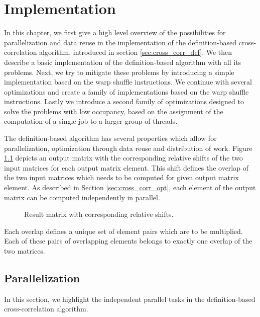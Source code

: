\chapter{Implementation}
\label{sec:implementation}

In this chapter, we first give a high level overview of the possibilities for parallelization and data reuse in the implementation of the definition-based cross-correlation algorithm, introduced in section \ref{sec:cross_corr_def}. We then describe a basic implementation of the definition-based algorithm with all its problems. Next, we try to mitigate these problems by introducing a simple implementation based on the warp shuffle instructions. We continue with several optimizations and create a family of implementations based on the warp shuffle instructions. Lastly we introduce a second family of optimizations designed to solve the problems with low occupancy, based on the assignment of the computation of a single job to a larger group of threads.


The definition-based algorithm has several properties which allow for parallelization, optimization through data reuse and distribution of work. Figure \ref{fig:cross_corr_shifts} depicts an output matrix with the corresponding relative shifts of the two input matrices for each output matrix element. This shift defines the overlap of the two input matrices which needs to be computed for given output matrix element. As described in Section \ref{sec:cross_corr_opt}, each element of the output matrix can be computed independently in parallel.

\begin{figure}[ht]
	\fontsize{6}{8}\selectfont
	\centering
	\def\svgwidth{0.55\textwidth}
	
	\caption{Result matrix with corresponding relative shifts.}
	\label{fig:cross_corr_shifts}
\end{figure}

Each overlap defines a unique set of element pairs which are to be multiplied. Each of these pairs of overlapping elements belongs to exactly one overlap of the two matrices.


\section{Parallelization}
\label{sec:implementation_parallelism}
In this section, we highlight the independent parallel tasks in the definition-based cross-correlation algorithm.  


